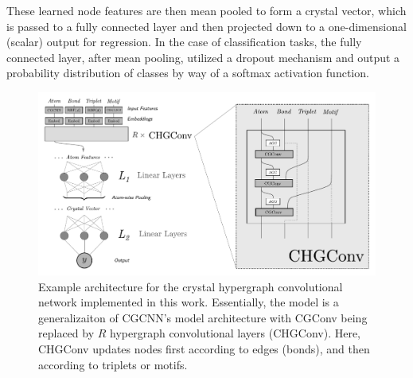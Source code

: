 \documentclass[twoside,twocolumn,9pt]{article}
\begin{document}
These learned node features are then mean pooled to form a crystal vector, which is passed to a fully connected layer and then projected down to a one-dimensional (scalar) output for regression. In the case of classification tasks, the fully connected layer, after mean pooling, utilized a dropout mechanism and output a probability distribution of classes by way of a softmax activation function.

\begin{figure}
	\centering
	\includegraphics[scale=.75]{arch_horiz.pdf}
	\caption{Example architecture for the crystal hypergraph convolutional network implemented in this work. Essentially, the model is a generalizaiton of CGCNN's \cite{cgcnn} model architecture with CGConv being replaced by $R$ hypergraph convolutional layers (CHGConv). Here, CHGConv updates nodes first according to edges (bonds), and then according to triplets or motifs. }
	\label{fig:architecture}
\end{figure}
\end{document}
